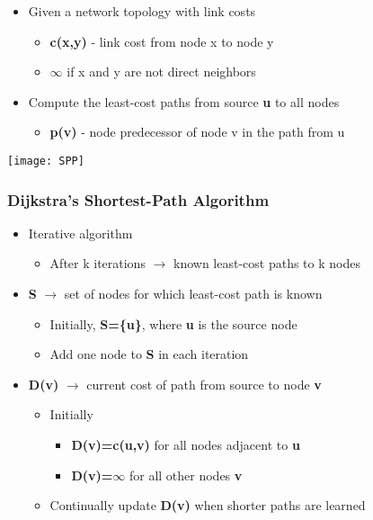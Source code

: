 \documentclass[../resumosRCOM.tex]{subfiles}
\begin{document}
\begin{itemize}
    \item Given a network topology with link costs
    \begin{itemize}
        \item \textbf{c(x,y)} - link cost from node x to node y
        \item $\infty$ if x and y are not direct neighbors
    \end{itemize}
    \item Compute the least-cost paths from source \textbf{u} to all nodes
    \begin{itemize}
        \item \textbf{p(v)} - node predecessor of node v in the path from u
    \end{itemize}
\end{itemize}

\begin{center}
    \texttt{[image: SPP]}
\end{center}

\subsubsection{Dijkstra’s Shortest-Path Algorithm}

\begin{itemize}
    \item Iterative algorithm
    \begin{itemize}
        \item After k iterations $\rightarrow$ known least-cost paths to k nodes
    \end{itemize}
    \item \textbf{S} $\rightarrow$ set of nodes for which least-cost path is known
    \begin{itemize}
        \item Initially, \textbf{S=\{u\}}, where \textbf{u} is the source node
        \item Add one node to \textbf{S} in each iteration
    \end{itemize}
    \item \textbf{D(v)} $\rightarrow$ current cost of path from source to node \textbf{v}
    \begin{itemize}
        \item Initially
        \begin{itemize}
            \item \textbf{D(v)=c(u,v)} for all nodes adjacent to \textbf{u}
            \item \textbf{D(v)=$\infty$} for all other nodes \textbf{v}
        \end{itemize}
        \item Continually update \textbf{D(v)} when shorter paths are learned
    \end{itemize}
\end{itemize}
\end{document}
